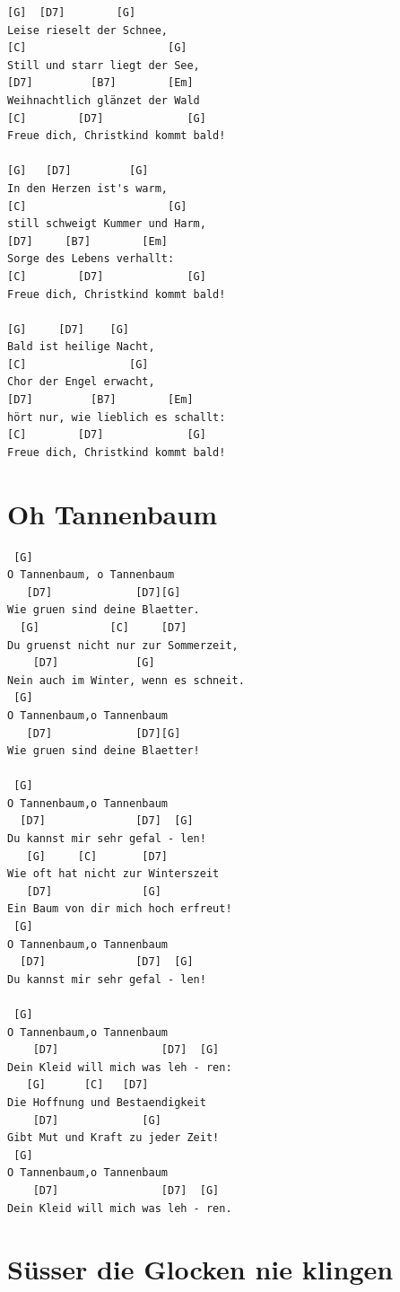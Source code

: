 \documentclass[
]{book}
\let\stdsection\section
\renewcommand\section{\clearpage\stdsection}
\begin{document}
\begin{verbatim}
[G]  [D7]        [G]
Leise rieselt der Schnee,
[C]                      [G]
Still und starr liegt der See,
[D7]         [B7]        [Em]
Weihnachtlich glänzet der Wald
[C]        [D7]             [G]
Freue dich, Christkind kommt bald!

[G]   [D7]         [G]
In den Herzen ist's warm,
[C]                      [G]
still schweigt Kummer und Harm,
[D7]     [B7]        [Em]
Sorge des Lebens verhallt:
[C]        [D7]             [G]
Freue dich, Christkind kommt bald!

[G]     [D7]    [G]
Bald ist heilige Nacht,
[C]                [G]
Chor der Engel erwacht,
[D7]         [B7]        [Em]
hört nur, wie lieblich es schallt:
[C]        [D7]             [G]
Freue dich, Christkind kommt bald!
\end{verbatim}

\hypertarget{weihnachten-oh-tannenbaum}{%
\section{Oh Tannenbaum}\label{weihnachten-oh-tannenbaum}}

\begin{verbatim}
 [G]          
O Tannenbaum, o Tannenbaum
   [D7]             [D7][G]      
Wie gruen sind deine Blaetter.
  [G]           [C]     [D7]     
Du gruenst nicht nur zur Sommerzeit,
    [D7]            [G]     
Nein auch im Winter, wenn es schneit.
 [G]      
O Tannenbaum,o Tannenbaum
   [D7]             [D7][G]     
Wie gruen sind deine Blaetter!
  
 [G]  
O Tannenbaum,o Tannenbaum 
  [D7]              [D7]  [G]      
Du kannst mir sehr gefal - len!
   [G]     [C]       [D7]       
Wie oft hat nicht zur Winterszeit
   [D7]              [G]     
Ein Baum von dir mich hoch erfreut!
 [G]  
O Tannenbaum,o Tannenbaum
  [D7]              [D7]  [G]     
Du kannst mir sehr gefal - len!

 [G]    
O Tannenbaum,o Tannenbaum
    [D7]                [D7]  [G]     
Dein Kleid will mich was leh - ren:
   [G]      [C]   [D7]  
Die Hoffnung und Bestaendigkeit
    [D7]             [G]  
Gibt Mut und Kraft zu jeder Zeit!
 [G]  
O Tannenbaum,o Tannenbaum
    [D7]                [D7]  [G]     
Dein Kleid will mich was leh - ren. 
\end{verbatim}

\hypertarget{weihnachten-suesser-die-glocken-nie-klingen}{%
\section{Süsser die Glocken nie klingen}\label{weihnachten-suesser-die-glocken-nie-klingen}}
\end{document}
